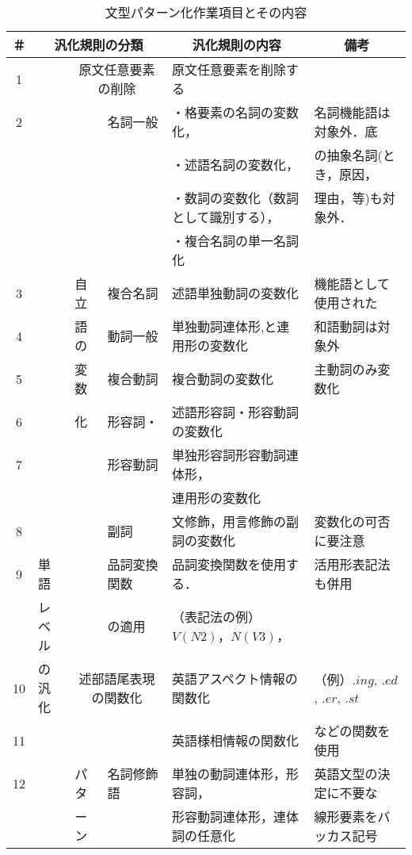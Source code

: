 \documentclass{nlp}
\begin{document}
\begin{table}[!htbp]
\footnotesize
\begin{center}
\caption{文型パターン化作業項目とその内容}
\begin{tabular}{|c|l|p{7mm}|l|l|l|}
\hline
＃& \multicolumn{3}{|c|}{汎化規則の分類} &  \multicolumn{1}{|c|}{汎化規則の内容} &  \multicolumn{1}{|c|}{備考} \\ \hline
1 & & \multicolumn{2}{|c|}{原文任意要素の削除} & 原文任意要素を削除する & \\   \cline{1-1}\cline{3-6}
2 & & & 名詞一般 & ・格要素の名詞の変数化，& 名詞機能語は対象外．底 \\
 & & & & ・述語名詞の変数化，& の抽象名詞(とき，原因，\\
 & & & & ・数詞の変数化（数詞として識別する），& 理由，等)も対象外．\\
 & & & & ・複合名詞の単一名詞化 & \\ \cline{1-1}\cline{4-6}
3 & & 自立 & 複合名詞 & 述語単独動詞の変数化 & 機能語として使用された \\ \cline{1-1}\cline{4-5}
4 & & 語の & 動詞一般 & 単独動詞連体形,と連用形の変数化 & 和語動詞は対象外 \\ \cline{1-1}\cline{4-6}
5 & & 変数 & 複合動詞 & 複合動詞の変数化 & 主動詞のみ変数化 \\ \cline{1-1}\cline{4-6}
6 & & 化 & 形容詞・ & 述語形容詞・形容動詞の変数化  & \\ \cline{1-1}\cline{5-5}
7 & & & 形容動詞 & 単独形容詞形容動詞連体形， & \\ 
 & & & & 連用形の変数化 & \\ \cline{1-1}\cline{4-6}
8 & & & 副詞 & 文修飾，用言修飾の副詞の変数化 & 変数化の可否に要注意 \\ \cline{1-1}\cline{4-6}
9 & 単語 & & 品詞変換関数 & 品詞変換関数を使用する． & 活用形表記法も併用 \\ 
 & レベル & & の適用 & （表記法の例）$V(N2)$，$N(V3)$，& \\ \cline{1-1}\cline{3-6}
10 & の汎化 & \multicolumn{2}{|c|}{述部語尾表現の関数化} & 英語アスペクト情報の関数化 & （例）$.ing$, $.ed$, $.er$, $.st$ \\ \cline{1-1}\cline{5-5}
11 & & \multicolumn{2}{|c|}{ } & 英語様相情報の関数化 & などの関数を使用 \\ \cline{1-1}\cline{3-6}
12 & & パタ &名詞修飾語 & 単独の動詞連体形，形容詞，& 英語文型の決定に不要な \\
 & & ーン & & 形容動詞連体形，連体詞の任意化 & 線形要素をバッカス記号 \\  \cline{1-1}\cline{4-5}

\end{tabular}
\end{center}
\end{table}
\end{document}
